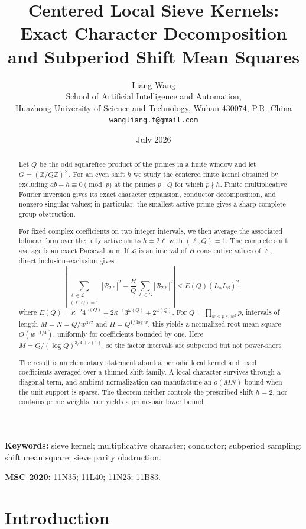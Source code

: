 \documentclass[11pt]{article}
\title{\textbf{Centered Local Sieve Kernels:}\\
\textbf{Exact Character Decomposition and Subperiod Shift Mean Squares}}
\author{Liang Wang\\
\small School of Artificial Intelligence and Automation,\\[-0.2em]
\small Huazhong University of Science and Technology, Wuhan 430074, P.R. China\\
\small \texttt{wangliang.f@gmail.com}}
\date{July 2026}
\theoremstyle{definition}
\theoremstyle{remark}
\newcommand{\Z}{\mathbb Z}
\newcommand{\cB}{\mathcal B}
\newcommand{\cL}{\mathcal L}
\begin{document}
\maketitle

\begin{abstract}
Let $Q$ be the odd squarefree product of the primes in a finite window and let $G=(\Z/Q\Z)^\times$.  For an even shift $h$ we study the centered finite kernel obtained by excluding $ab+h\equiv0\pmod p$ at the primes $p\mid Q$ for which $p\nmid h$.  Finite multiplicative Fourier inversion gives its exact character expansion, conductor decomposition, and nonzero singular values; in particular, the smallest active prime gives a sharp complete-group obstruction.

For fixed complex coefficients on two integer intervals, we then average the associated bilinear form over the fully active shifts $h=2\ell$ with $(\ell,Q)=1$.  The complete shift average is an exact Parseval sum.  If $\cL$ is an interval of $H$ consecutive values of $\ell$, direct inclusion--exclusion gives
\[
 \left|\sum_{\substack{\ell\in\cL\\(\ell,Q)=1}}|\cB_{2\ell}|^2
 -\frac HQ\sum_{\ell\in G}|\cB_{2\ell}|^2\right|
 \le E(Q)(L_\alpha L_\beta)^2,
\]
where $E(Q)=\kappa^{-2}4^{\omega(Q)}+2\kappa^{-1}3^{\omega(Q)}+2^{\omega(Q)}$.  For $Q=\prod_{w<p\le w^2}p$, intervals of length $M=N=Q/w^{3/2}$ and $H=Q^{1/\log w}$, this yields a normalized root mean square $O(w^{-1/4})$, uniformly for coefficients bounded by one.  Here $M=Q/(\log Q)^{3/4+o(1)}$, so the factor intervals are subperiod but not power-short.

The result is an elementary statement about a periodic local kernel and fixed coefficients averaged over a thinned shift family.  A local character survives through a diagonal term, and ambient normalization can manufacture an $o(MN)$ bound when the unit support is sparse.  The theorem neither controls the prescribed shift $h=2$, nor contains prime weights, nor yields a prime-pair lower bound.
\end{abstract}

\noindent\textbf{Keywords:} sieve kernel; multiplicative character; conductor; subperiod sampling; shift mean square; sieve parity obstruction.

\medskip
\noindent\textbf{MSC 2020:} 11N35; 11L40; 11N25; 11B83.

\section{Introduction}\label{sec:introduction}
\end{document}
